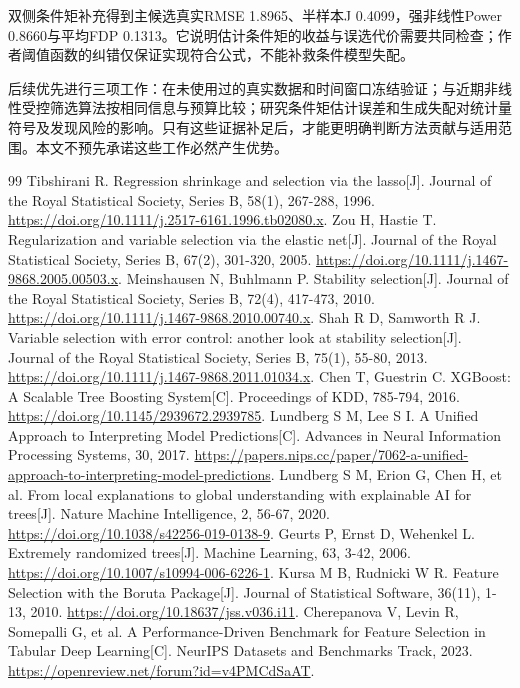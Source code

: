 \documentclass[UTF8,11pt,a4paper]{ctexart}
\begin{document}
双侧条件矩补充得到主候选真实RMSE 1.8965、半样本J 0.4099，强非线性Power 0.8660与平均FDP 0.1313。它说明估计条件矩的收益与误选代价需要共同检查；作者阈值函数的纠错仅保证实现符合公式，不能补救条件模型失配。

后续优先进行三项工作：在未使用过的真实数据和时间窗口冻结验证；与近期非线性受控筛选算法按相同信息与预算比较；研究条件矩估计误差和生成失配对统计量符号及发现风险的影响。只有这些证据补足后，才能更明确判断方法贡献与适用范围。本文不预先承诺这些工作必然产生优势。
\begin{thebibliography}{99}
 Tibshirani R. Regression shrinkage and selection via the lasso[J]. Journal of the Royal Statistical Society, Series B, 58(1), 267-288, 1996. \url{https://doi.org/10.1111/j.2517-6161.1996.tb02080.x}.
 Zou H, Hastie T. Regularization and variable selection via the elastic net[J]. Journal of the Royal Statistical Society, Series B, 67(2), 301-320, 2005. \url{https://doi.org/10.1111/j.1467-9868.2005.00503.x}.
 Meinshausen N, Buhlmann P. Stability selection[J]. Journal of the Royal Statistical Society, Series B, 72(4), 417-473, 2010. \url{https://doi.org/10.1111/j.1467-9868.2010.00740.x}.
 Shah R D, Samworth R J. Variable selection with error control: another look at stability selection[J]. Journal of the Royal Statistical Society, Series B, 75(1), 55-80, 2013. \url{https://doi.org/10.1111/j.1467-9868.2011.01034.x}.
 Chen T, Guestrin C. XGBoost: A Scalable Tree Boosting System[C]. Proceedings of KDD, 785-794, 2016. \url{https://doi.org/10.1145/2939672.2939785}.
 Lundberg S M, Lee S I. A Unified Approach to Interpreting Model Predictions[C]. Advances in Neural Information Processing Systems, 30, 2017. \url{https://papers.nips.cc/paper/7062-a-unified-approach-to-interpreting-model-predictions}.
 Lundberg S M, Erion G, Chen H, et al. From local explanations to global understanding with explainable AI for trees[J]. Nature Machine Intelligence, 2, 56-67, 2020. \url{https://doi.org/10.1038/s42256-019-0138-9}.
 Geurts P, Ernst D, Wehenkel L. Extremely randomized trees[J]. Machine Learning, 63, 3-42, 2006. \url{https://doi.org/10.1007/s10994-006-6226-1}.
 Kursa M B, Rudnicki W R. Feature Selection with the Boruta Package[J]. Journal of Statistical Software, 36(11), 1-13, 2010. \url{https://doi.org/10.18637/jss.v036.i11}.
 Cherepanova V, Levin R, Somepalli G, et al. A Performance-Driven Benchmark for Feature Selection in Tabular Deep Learning[C]. NeurIPS Datasets and Benchmarks Track, 2023. \url{https://openreview.net/forum?id=v4PMCdSaAT}.

\end{thebibliography}
\end{document}

